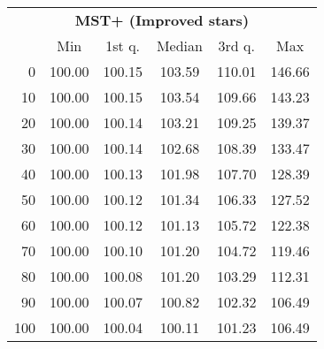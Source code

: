 \begin{tabular}{r|ccccc}
  \multicolumn{6}{c}{{\bf MST+ (Improved stars)}} \\
  & Min & 1st q. & Median & 3rd q. & Max \\ \hline\hline
  0 & 100.00 & 100.15 & 103.59 & 110.01 & 146.66
\\ 10 & 100.00 & 100.15 & 103.54 & 109.66 & 143.23
\\ 20 & 100.00 & 100.14 & 103.21 & 109.25 & 139.37
\\ 30 & 100.00 & 100.14 & 102.68 & 108.39 & 133.47
\\ 40 & 100.00 & 100.13 & 101.98 & 107.70 & 128.39
\\ 50 & 100.00 & 100.12 & 101.34 & 106.33 & 127.52
\\ 60 & 100.00 & 100.12 & 101.13 & 105.72 & 122.38
\\ 70 & 100.00 & 100.10 & 101.20 & 104.72 & 119.46
\\ 80 & 100.00 & 100.08 & 101.20 & 103.29 & 112.31
\\ 90 & 100.00 & 100.07 & 100.82 & 102.32 & 106.49
\\ 100 & 100.00 & 100.04 & 100.11 & 101.23 & 106.49
\end{tabular}
